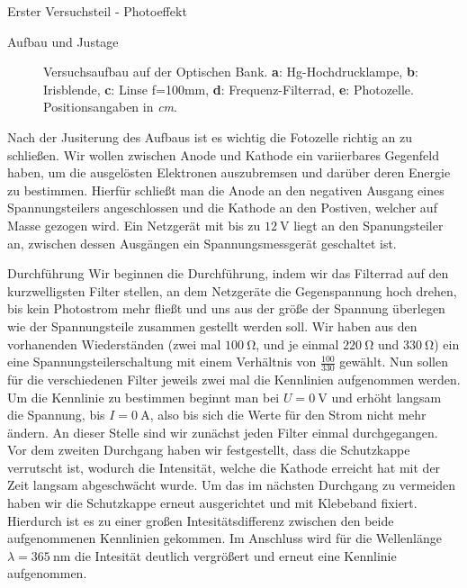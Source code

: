 \documentclass[pdftex, a4paper,11pt, twoside, ngerman]{report}
\begin{document}
\begin{chapter}{Erster Versuchsteil - Photoeffekt}
\begin{section}{Aufbau und Justage}
\begin{figure}[htbp]
\begin{center}
          \caption{Versuchsaufbau auf der Optischen Bank. \textbf{a}:
              Hg-Hochdrucklampe, \textbf{b}: Irisblende,  \textbf{c}: Linse
              f=100mm, \textbf{d}: Frequenz-Filterrad, \textbf{e}: Photozelle.
              Positionsangaben in \textit{cm}. \cite{bib:LDDidactic}}
          \label{fig:Planckaufbau}
        \end{center}
      \end{figure}
      Nach der Jusiterung des Aufbaus ist es wichtig die Fotozelle richtig an
      zu schließen. Wir wollen zwischen Anode und Kathode ein variierbares
      Gegenfeld haben, um die ausgelösten Elektronen auszubremsen und darüber
      deren Energie zu bestimmen. Hierfür schließt man die Anode an den
      negativen Ausgang eines Spannungsteilers angeschlossen und die Kathode
      an den Postiven, welcher auf Masse gezogen wird. Ein Netzgerät mit bis
      zu $\SI{12}{\volt}$ liegt an den Spanungsteiler an, zwischen dessen
      Ausgängen ein Spannungsmessgerät geschaltet ist.
     
    \end{section}
   
   
   
    \begin{section}{Durchführung}
      \label{chp:Aufbau:sec:ERSTERTEIL:subsec:UNTERTEIL}
      Wir beginnen die Durchführung, indem wir das Filterrad auf den
      kurzwelligsten Filter stellen, an dem Netzgeräte die Gegenspannung hoch
      drehen, bis kein Photostrom mehr fließt und uns aus der größe der
      Spannung überlegen wie der Spannungsteile zusammen gestellt werden soll.
      Wir haben aus den vorhanenden Wiederständen (zwei mal $\SI{100}{\ohm}$,
      und je einmal $\SI{220}{\ohm}$ und $\SI{330}{\ohm}$) ein eine
      Spannungsteilerschaltung mit einem Verhältnis von $\frac{100}{330}$
      gewählt. Nun sollen für die verschiedenen Filter jeweils zwei mal die
      Kennlinien aufgenommen werden.
      Um die Kennlinie zu bestimmen beginnt man bei $U=\SI{0}{\volt}$ und
      erhöht langsam die Spannung, bis $I=\SI{0}{\ampere}$, also bis sich die
      Werte für den Strom nicht mehr ändern. An dieser Stelle sind wir
      zunächst jeden Filter einmal durchgegangen. Vor dem zweiten Durchgang
      haben wir festgestellt, dass die Schutzkappe verrutscht ist, wodurch die
      Intensität, welche die Kathode erreicht hat mit der Zeit langsam
      abgeschwächt wurde. Um das im nächsten Durchgang zu vermeiden haben wir
      die Schutzkappe erneut ausgerichtet und mit Klebeband fixiert. Hierdurch
      ist es zu einer großen Intesitätsdifferenz zwischen den beide
      aufgenommenen Kennlinien gekommen. Im Anschluss wird für die Wellenlänge
      $\lambda = \SI{365}{\nano\meter}$ die Intesität deutlich vergrößert und
      erneut eine Kennlinie aufgenommen. 


\end{section}
\end{chapter}
\end{document}
